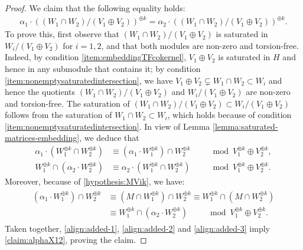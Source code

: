 \documentclass[a4paper,11pt,reqno]{amsart}
\numberwithin{equation}{section}
\theoremstyle{plain}
\theoremstyle{definition}
\begin{document}
\begin{proof}  
We claim that the following equality holds:
\begin{align} \label{claim:alphaX12}
\alpha_1 \cdot \left( (W_1 \cap W_2 )/ ( V_1 \oplus V_2) \right)^{\oplus k} = \alpha_2 \cdot \left( (W_1 \cap W_2 )/ ( V_1 \oplus V_2) \right)^{\oplus k}. 
\end{align}
To prove this, first observe that $(W_1 \cap W_2 )/ ( V_1 \oplus V_2)$ is saturated in $W_i/(V_1 \oplus V_2)$ for $i = 1,2$, and that both modules are non-zero and torsion-free. Indeed, by condition \eqref{item:embeddingTFcokernel}, $V_1\oplus V_2$ is saturated in $H$ and hence in any submodule that contains it; by condition \eqref{item:nonemptysaturatedintersection}, we have $V_1\oplus V_2\subsetneq W_1 \cap W_2 \subset W_i$ and hence the quotients $(W_1 \cap W_2 )/ ( V_1 \oplus V_2)$ and $W_i/(V_1 \oplus V_2)$ are non-zero and torsion-free. The saturation of $(W_1 \cap W_2 )/ ( V_1 \oplus V_2) \subset W_i/(V_1 \oplus V_2)$ follows from the saturation of $W_1 \cap W_2 \subset W_i$, which holds because of condition \eqref{item:nonemptysaturatedintersection}. 
In view of Lemma \ref{lemma:saturated-matrices-embedding}, we deduce that 
\begin{align} \label{align:added-1}
    \alpha_1 \cdot \left( W_1^{\oplus k} \cap W_2^{\oplus k} \right) &\equiv \left(\alpha_1 \cdot W_1^{\oplus k}\right) \cap W_2^{\oplus k}  \quad \quad  \mod V_1^{\oplus k} \oplus V_2^{\oplus k},\\
    \label{align:added-2}
    W_1^{\oplus k}  \cap \left( \alpha_2 \cdot W_2^{\oplus k}\right)   &\equiv \alpha_2 \cdot \left( W_1^{\oplus k} \cap W_2^{\oplus k} \right) \quad \quad  \mod V_1^{\oplus k} \oplus V_2^{\oplus k}.
\end{align}
Moreover, because of \eqref{hypothesis:MVik}, we have:
\begin{align} \label{align:added-3}
\begin{split}
    \left(\alpha_1 \cdot W_1^{\oplus k}\right) \cap W_2^{\oplus k}  
&\equiv 
\left( M \cap W_1^{\oplus k} \right) \cap W_2^{\oplus k}
\equiv
W_1^{\oplus k}  \cap \left( M \cap W_2^{\oplus k}\right) 
\\
&
\equiv W_1^{\oplus k}  \cap \left( \alpha_2 \cdot W_2^{\oplus k}\right) \quad \quad
\mod V_1^{\oplus k} \oplus V_2^{\oplus k}.
\end{split}
\end{align}
Taken together, \eqref{align:added-1}, \eqref{align:added-2} and \eqref{align:added-3} imply \eqref{claim:alphaX12}, proving the claim. 


\end{proof}
\end{document}
